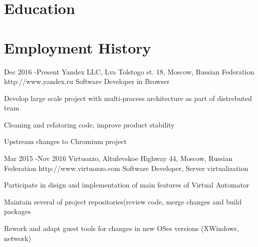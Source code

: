 \documentclass[10pt]{article} %
\begin{document}
\section{Education}



\section{Employment History}

\job
{Dec 2016 -}{Present}
{Yandex LLC, Lva Tolstogo st. 18, Moscow, Russian Federation}
{http://www.yandex.ru}
{Software Developer in Browser}
{
\begin{itemize-noindent}
\setlength\itemsep{0em}
\item{Develop large scale project with multi-process architecture as part of distrebuted team}
\item{Cleaning and refatoring code, improve product stability}
\item{Upstream changes to Chromium project}
\end{itemize-noindent}
}


\job
{Mar 2015 -}{Nov 2016}
{Virtuozzo, Altufevskoe Highway 44, Moscow, Russian Federation}
{http://www.virtuozzo.com}
{Software Developer, Server virtualization}
{
\begin{itemize-noindent}
\setlength\itemsep{0em}
\item{Participate in disign and implementation of main features of Virtual Automator}
\item{Maintain several of project repositories(review code, merge changes and build packages}
\item{Rework and adapt guest tools for changes in new OSes versions (XWindows, network)}
\end{itemize-noindent}
}

\end{document}
